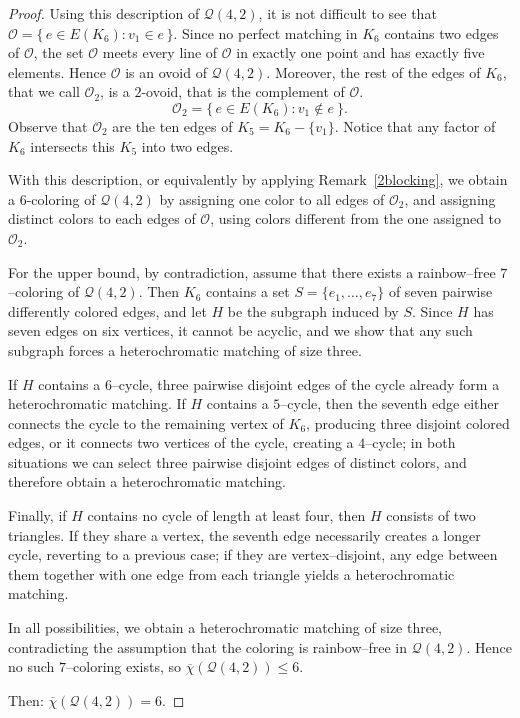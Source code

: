 \documentclass[12pt]{article}
\begin{document}
\begin{proof}
Using this description of $\mathcal{Q}(4,2)$, it is not difficult to see that $\mathcal{O}=\{\, e\in E(K_6)\colon v_1\in e \,\}.$ Since no perfect matching in $K_6$ contains two edges of $\mathcal{O}$, the set $\mathcal{O}$ meets every line of $\mathcal{O}$ in exactly one point and has exactly five elements. Hence $\mathcal{O}$ is an ovoid of $\mathcal{Q}(4,2)$. 
%
Moreover, the rest of the edges of $K_6$, that we call ${\mathcal{O}}_2$, is a $ 2$-ovoid, that is the complement of $\mathcal{O}$. 
$$\mathcal{O}_2=\{\, e\in E(K_6)\colon v_1\notin e \ \}.$$ Observe that ${\mathcal{O}}_2$ are the ten edges of $K_5=K_6-\{v_1\}$.
Notice that any factor of $K_6$ intersects this $K_5$ into two edges.  



With this description, or equivalently by applying Remark~\ref{2blocking}, we obtain a $6$-coloring of $\mathcal{Q}(4,2)$ by assigning one color to all edges of $\mathcal{O}_2$, and assigning distinct colors to each edges of $\mathcal{O}$, using colors different from the one assigned to $\mathcal{O}_2$.

For the upper bound, by contradiction, assume that there exists a rainbow–free $7$–coloring of $\mathcal{Q}(4,2)$. Then $K_6$ contains a set $S=\{e_1,\dots,e_7\}$ of seven pairwise differently colored edges, and let $H$ be the subgraph induced by $S$. Since $H$ has seven edges on six vertices, it cannot be acyclic, and we show that any such subgraph forces a heterochromatic matching of size three.

If $H$ contains a $6$–cycle, three pairwise disjoint edges of the cycle already form a heterochromatic matching. If $H$ contains a $5$–cycle, then the seventh edge either connects the cycle to the remaining vertex of $K_6$, producing three disjoint colored edges, or it connects two vertices of the cycle, creating a $4$–cycle; in both situations we can select three pairwise disjoint edges of distinct colors, and therefore obtain a heterochromatic matching. 

Finally, if $H$ contains no cycle of length at least four, then $H$ consists of two triangles. If they share a vertex, the seventh edge necessarily creates a longer cycle, reverting to a previous case; if they are vertex–disjoint, any edge between them together with one edge from each triangle yields a heterochromatic matching.

In all possibilities, we obtain a heterochromatic matching of size three, contradicting the assumption that the coloring is rainbow–free in $\mathcal{Q}(4,2)$. Hence no such $7$–coloring exists, so $
\overline{\chi}(\mathcal{Q}(4,2)) \le 6$.

Then: $\overline{\chi}(\mathcal{Q}(4,2))= 6$.
\end{proof}
\end{document}
